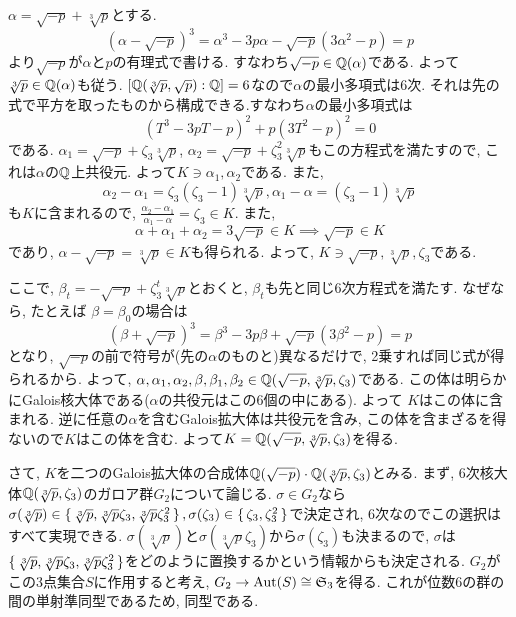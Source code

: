 {\begin{probans} %
$\alpha = \sqrt{-p} + \sqrt[3]{p}$とする. \[(\alpha - \sqrt{-p})^3 = \alpha^3 -3p\alpha - \sqrt{-p}(3\alpha^2 -p)  = p\]
より$\sqrt{-p}$が$\alpha$と$p$の有理式で書ける. すなわち$\sqrt{-p} \in \mathbb{Q}(\alpha)$である. よって$\sqrt[3]{p}\in \mathbb{Q}(\alpha)$も従う. $[\mathbb{Q}(\sqrt[3]{p}, \sqrt{p}):\mathbb{Q}] = 6$なので$\alpha$の最小多項式は6次. それは先の式で平方を取ったものから構成できる.すなわち$\alpha$の最小多項式は
\[(T^3 - 3pT - p)^2 +p(3T^2 - p)^2 = 0\]
である. $\alpha_1 = \sqrt{-p}+\zeta_3\sqrt[3]{p}$, $\alpha_2 = \sqrt{-p} + \zeta_3^2\sqrt[3]{p}$もこの方程式を満たすので, これは$\alpha$の$\mathbb{Q}$上共役元. よって$K\ni \alpha_1,\alpha_2$である. また,
\[\alpha_2 - \alpha_1 = \zeta_3(\zeta_3-1)\sqrt[3]{p}, \alpha_1-\alpha = (\zeta_3 - 1)\sqrt[3]{p}\]
も$K$に含まれるので, $\frac{\alpha_2-\alpha_1}{\alpha_1-\alpha} = \zeta_3\in K$. また,
\[\alpha + \alpha_1 + \alpha_2 = 3\sqrt{-p}\in K\implies \sqrt{-p}\in K\]
であり, $\alpha - \sqrt{-p} = \sqrt[3]{p}\in K$も得られる. よって, $K\ni \sqrt{-p}, \sqrt[3]{p}, \zeta_3$である. \par
ここで, $\beta_{t} = - \sqrt{-p} + \zeta_3^{t}\sqrt[3]{p}$とおくと, $\beta_{t}$も先と同じ6次方程式を満たす. なぜなら, たとえば $\beta=\beta_0$の場合は
\[(\beta + \sqrt{-p})^3 = \beta^3 - 3p\beta + \sqrt{-p}(3\beta^2 - p) = p\]
となり, $\sqrt{-p}$の前で符号が(先の$\alpha$のものと)異なるだけで, 2乗すれば同じ式が得られるから. よって, $\alpha,\alpha_1,\alpha_2,\beta,\beta_1,\beta_2\in \mathbb{Q}(\sqrt{-p}, \sqrt[3]{p},\zeta_3)$である. この体は明らかにGalois核大体である($\alpha$の共役元はこの6個の中にある). よって $K$はこの体に含まれる. 逆に任意の$\alpha$を含むGalois拡大体は共役元を含み, この体を含まざるを得ないので$K$はこの体を含む. よって$K=\mathbb{Q}(\sqrt{-p},\sqrt[3]{p},\zeta_3)$を得る. \par
さて, $K$を二つのGalois拡大体の合成体$\mathbb{Q}(\sqrt{-p})\cdot \mathbb{Q}(\sqrt[3]{p},\zeta_3)$とみる. まず, 6次核大体$\mathbb{Q}(\sqrt[3]{p},\zeta_3)$のガロア群$G_2$について論じる. $\sigma\in G_2$なら$\sigma(\sqrt[3]{p})\in \set{\sqrt[3]{p},\sqrt[3]{p}\zeta_3,\sqrt[3]{p}\zeta_3^2}, \sigma(\zeta_3)\in \set{\zeta_3,\zeta_3^2}$で決定され, 6次なのでこの選択はすべて実現できる. $\sigma(\sqrt[3]{p})$と$\sigma(\sqrt[3]{p}\zeta_3)$から$\sigma(\zeta_3)$も決まるので, $\sigma$は$\set{\sqrt[3]{p},\sqrt[3]{p}\zeta_3,\sqrt[3]{p}\zeta_3^2}$をどのように置換するかという情報からも決定される. $G_2$がこの3点集合$S$に作用すると考え, $G_2\to \mathrm{Aut}(S)\cong \mathfrak{S}_{3}$を得る. これが位数6の群の間の単射準同型であるため, 同型である. \\

\end{probans}}
